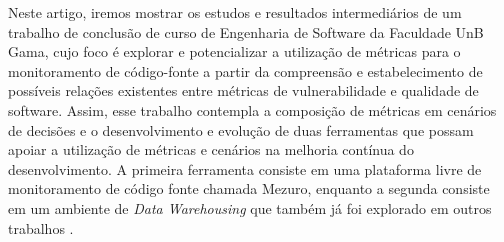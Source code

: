 Neste artigo, iremos mostrar os estudos e resultados intermediários de um trabalho de conclusão de curso de Engenharia de Software da Faculdade UnB Gama, cujo foco é explorar e potencializar a utilização de métricas para o monitoramento de código-fonte a partir da compreensão e estabelecimento de possíveis relações existentes entre métricas de vulnerabilidade e qualidade de software. Assim, esse trabalho contempla a composição de métricas em cenários de decisões e o desenvolvimento e evolução de duas ferramentas que possam apoiar a utilização de métricas e cenários na melhoria contínua do desenvolvimento. A primeira ferramenta consiste em uma plataforma livre de monitoramento de código fonte chamada Mezuro, enquanto a segunda consiste em um ambiente de \emph{Data Warehousing} que também já foi explorado em outros trabalhos \cite{Silveira2010}\cite{mazuco2011}.
